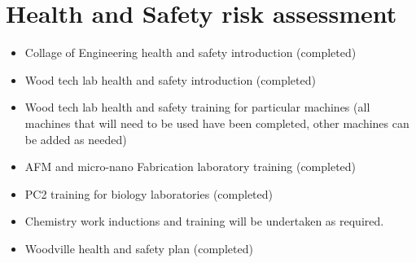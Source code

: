 \section{Health and Safety risk assessment}
\begin{itemize}
\item Collage of Engineering health and safety introduction (completed)
\end{itemize}

\begin{itemize}
\item Wood tech lab health and safety introduction (completed)
\end{itemize}

\begin{itemize}
\item Wood tech lab health and safety training for particular machines (all machines
that will need to be used have been completed, other machines can be added as
needed)
\end{itemize}

\begin{itemize}
\item AFM and micro-nano Fabrication laboratory training (completed)
\end{itemize}

\begin{itemize}
\item  PC2 training for biology laboratories (completed)
\end{itemize}

\begin{itemize}
\item Chemistry work inductions and training will be undertaken as required.
\end{itemize}
\begin{itemize}
\item Woodville health and safety plan (completed)
\end{itemize}

  
  
